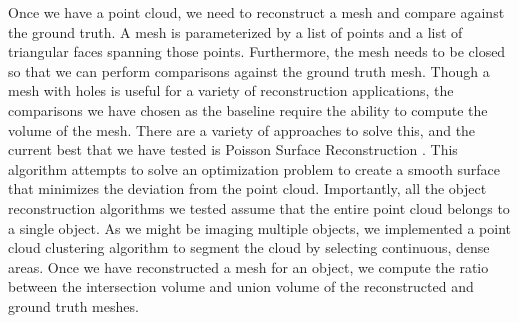 \documentclass[12pt,letterpaper]{article} %
\begin{document}
Once we have a point cloud, we need to reconstruct a mesh and compare against the ground truth.  A mesh is parameterized by a list of points and a list of triangular faces spanning those points.  Furthermore, the mesh needs to be closed so that we can perform comparisons against the ground truth mesh.  Though a mesh with holes is useful for a variety of reconstruction applications, the comparisons we have chosen as the baseline require the ability to compute the volume of the mesh.  There are a variety of approaches to solve this, and the current best that we have tested is Poisson Surface Reconstruction \cite{10.5555/1281957.1281965}.  This algorithm attempts to solve an optimization problem to create a smooth surface that minimizes the deviation from the point cloud.  Importantly, all the object reconstruction algorithms we tested assume that the entire point cloud belongs to a single object. As we might be imaging multiple objects, we implemented a point cloud clustering algorithm to segment the cloud by selecting continuous, dense areas.  Once we have reconstructed a mesh for an object, we compute the ratio between the intersection volume and union volume of the reconstructed and ground truth meshes.

%

\clearpage
\printbibliography%
\end{document}

